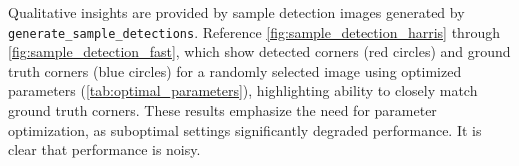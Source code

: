 \documentclass[journal]{IEEEtran}
\begin{document}
Qualitative insights are provided by sample detection images generated by \texttt{generate\_sample\_detections}. Reference \cref{fig:sample_detection_harris} through \cref{fig:sample_detection_fast}, which show detected corners (red circles) and ground truth corners (blue circles) for a randomly selected image using optimized parameters (\cref{tab:optimal_parameters}), highlighting ability to closely match ground truth corners. These results emphasize the need for parameter optimization, as suboptimal settings significantly degraded performance. It is clear that performance is noisy.\\

\begin{figure}[H]
    \centering
\end{figure}
\end{document}
